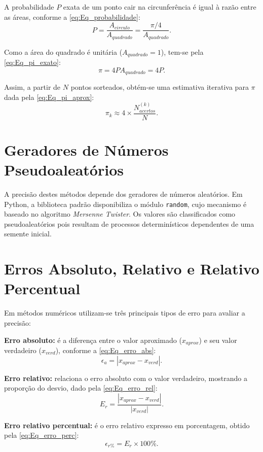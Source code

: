 A probabilidade $P$ exata de um ponto cair na circunferência é igual à razão entre as áreas, conforme a \autoref{eq:Eq_probabilidade}:
\begin{equation}\label{eq:Eq_probabilidade}
    P = \frac{A_{circulo}}{A_{quadrado}} = \frac{\pi/4}{A_{quadrado}}.
\end{equation}

Como a área do quadrado é unitária ($A_{quadrado}=1$), tem-se pela \autoref{eq:Eq_pi_exato}:
\begin{equation}\label{eq:Eq_pi_exato}
    \pi = 4 P A_{quadrado} = 4P.
\end{equation}

Assim, a partir de $N$ pontos sorteados, obtém-se uma estimativa iterativa para $\pi$ dada pela \autoref{eq:Eq_pi_aprox}:
\begin{equation}\label{eq:Eq_pi_aprox}
    \pi_{k} \approx 4 \times \frac{N_{acertos}^{(k)}}{N}.
\end{equation}

\section{Geradores de Números Pseudoaleatórios}

A precisão destes métodos depende dos geradores de números aleatórios. Em Python, a biblioteca padrão disponibiliza o módulo \texttt{random}, cujo mecanismo é baseado no algoritmo \textit{Mersenne Twister}. Os valores são classificados como pseudoaleatórios pois resultam de processos determinísticos dependentes de uma semente inicial.

\section{Erros Absoluto, Relativo e Relativo Percentual}

Em métodos numéricos utilizam-se três principais tipos de erro para avaliar a precisão:
\begin{alineas}
    \item \textbf{Erro absoluto:} é a diferença entre o valor aproximado ($x_{aprox}$) e seu valor verdadeiro ($x_{verd}$), conforme a \autoref{eq:Eq_erro_abs}:
    \begin{equation}\label{eq:Eq_erro_abs}
        \epsilon_{a} = |x_{aprox} - x_{verd}|.
    \end{equation}
    
    \item \textbf{Erro relativo:} relaciona o erro absoluto com o valor verdadeiro, mostrando a proporção do desvio, dado pela \autoref{eq:Eq_erro_rel}:
    \begin{equation}\label{eq:Eq_erro_rel}
        E_{r} = \frac{|x_{aprox} - x_{verd}|}{|x_{verd}|}.
    \end{equation}
    
    \item \textbf{Erro relativo percentual:} é o erro relativo expresso em porcentagem, obtido pela \autoref{eq:Eq_erro_perc}:
    \begin{equation}\label{eq:Eq_erro_perc}
        \epsilon_{r\%} = E_{r} \times 100\%.
    \end{equation}
\end{alineas}